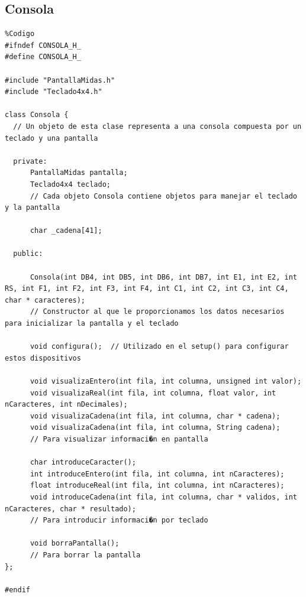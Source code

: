 \documentclass[11pt,twoside]{book}
\begin{document}
\subsection{Consola}
\begin{lstlisting}
%Codigo
#ifndef CONSOLA_H_
#define CONSOLA_H_

#include "PantallaMidas.h"
#include "Teclado4x4.h"

class Consola {
  // Un objeto de esta clase representa a una consola compuesta por un teclado y una pantalla
  
  private:
      PantallaMidas pantalla;
      Teclado4x4 teclado;
      // Cada objeto Consola contiene objetos para manejar el teclado y la pantalla
      
      char _cadena[41];
      
  public: 
  
      Consola(int DB4, int DB5, int DB6, int DB7, int E1, int E2, int RS, int F1, int F2, int F3, int F4, int C1, int C2, int C3, int C4, char * caracteres);
      // Constructor al que le proporcionamos los datos necesarios para inicializar la pantalla y el teclado
      
      void configura();  // Utilizado en el setup() para configurar estos dispositivos
      
      void visualizaEntero(int fila, int columna, unsigned int valor);
      void visualizaReal(int fila, int columna, float valor, int nCaracteres, int nDecimales);
      void visualizaCadena(int fila, int columna, char * cadena);  
      void visualizaCadena(int fila, int columna, String cadena);
      // Para visualizar informaci�n en pantalla
      
      char introduceCaracter();
      int introduceEntero(int fila, int columna, int nCaracteres);
      float introduceReal(int fila, int columna, int nCaracteres);
      void introduceCadena(int fila, int columna, char * validos, int nCaracteres, char * resultado);
      // Para introducir informaci�n por teclado
      
      void borraPantalla();
      // Para borrar la pantalla
};

#endif

\end{lstlisting}
\end{document}
